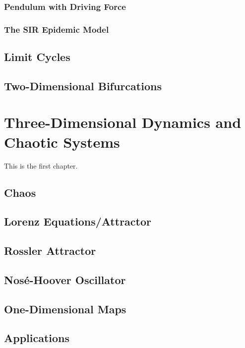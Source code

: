 \documentclass{amsbook}
\begin{document}
\subsection{Pendulum with Driving Force}

\subsection{The SIR Epidemic Model}


\section{Limit Cycles}


\section{Two-Dimensional Bifurcations}


\chapter{Three-Dimensional Dynamics and Chaotic Systems}
This is the first chapter.

\section{Chaos}

\section{Lorenz Equations/Attractor}

\section{Rossler Attractor}

\section{Nosé-Hoover Oscillator}

\section{One-Dimensional Maps}


\section{Applications}
\end{document}
